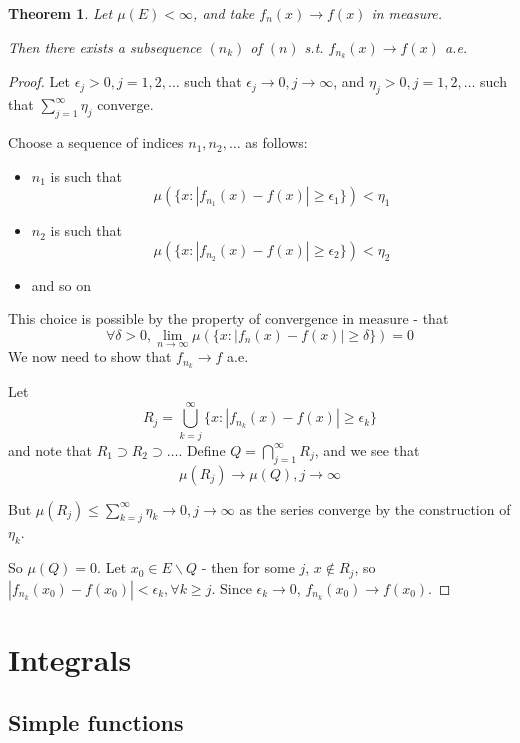 \documentclass[11pt,a4paper]{report}
\theoremstyle{plain}
\newtheorem{thm}{Theorem}[section]
\theoremstyle{definition}
\theoremstyle{remark}
\newcommand{\Union}{\bigcup}
\newcommand{\Intersection}{\bigcap}
\newcommand{\abs}[1]{\left| #1 \right|}
\begin{document}
\begin{thm}
    Let $\mu(E) < \infty$, and take $f_n(x) \rightarrow f(x)$ in measure.

    Then there exists a subsequence $(n_k)$ of $(n)$ s.t. $f_{n_k}(x) \rightarrow f(x)$ a.e.
\end{thm}

\begin{proof}
    Let $\epsilon_j > 0, j = 1, 2, \dots$ such that $\epsilon_j \rightarrow 0, j \rightarrow \infty$, and $\eta_j > 0, j = 1, 2, \dots$ such that $\sum_{j=1}^\infty \eta_j$ converge.

    Choose a sequence of indices $n_1, n_2, \dots$ as follows:
    \begin{itemize}
        \item $n_1$ is such that 
            $$\mu(\{ x : \abs{f_{n_1}(x) - f(x)} \ge \epsilon_1\}) < \eta_1$$
        \item $n_2$ is such that 
            $$\mu(\{ x : \abs{f_{n_2}(x) - f(x)} \ge \epsilon_2\}) < \eta_2$$
        \item and so on
    \end{itemize}

    This choice is possible by the property of convergence in measure - that
    $$ \forall \delta > 0, \lim_{n \rightarrow \infty} \mu(\{ x : \abs{f_n(x) - f(x)} \ge \delta\}) = 0$$
    We now need to show that $f_{n_k} \rightarrow f$ a.e.

    Let
    $$ R_j = \Union_{k=j}^\infty \{ x : \abs{f_{n_k}(x) - f(x)} \ge \epsilon_k\} $$
    and note that $R_1 \supset R_2 \supset \dots$. Define $Q = \Intersection_{j=1}^\infty R_j$, and we see that
    $$ \mu(R_j) \rightarrow \mu(Q), j \rightarrow \infty $$

    But $\mu(R_j) \le \sum_{k=j}^\infty \eta_k \rightarrow 0, j \rightarrow \infty$ as the series converge by the construction of $\eta_k$.

    So $\mu(Q) = 0$. Let $x_0 \in E \backslash Q$ - then for some $j$, $x \not \in R_j$, so $\abs{f_{n_k}(x_0) - f(x_0)} < \epsilon_k, \forall k \ge j$. Since $\epsilon_k \rightarrow 0$, $f_{n_k}(x_0) \rightarrow f(x_0)$.
\end{proof}

\chapter{Integrals}

\section{Simple functions}
\end{document}
